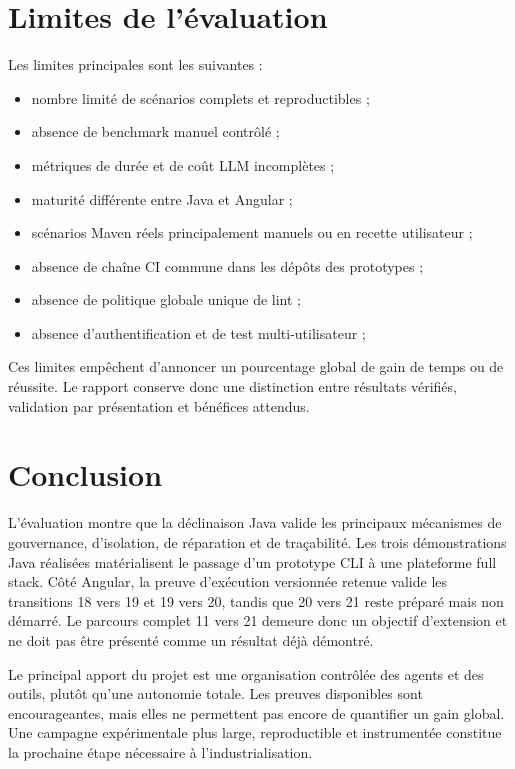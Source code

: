 \section{Limites de l'évaluation}

Les limites principales sont les suivantes :

\begin{itemize}
    \item nombre limité de scénarios complets et reproductibles ;
    \item absence de benchmark manuel contrôlé ;
    \item métriques de durée et de coût LLM incomplètes ;
    \item maturité différente entre Java et Angular ;
    \item scénarios Maven réels principalement manuels ou en recette utilisateur ;
    \item absence de chaîne CI commune dans les dépôts des prototypes ;
    \item absence de politique globale unique de lint ;
    \item absence d'authentification et de test multi-utilisateur ;
\end{itemize}

Ces limites empêchent d'annoncer un pourcentage global de gain de temps ou de réussite. Le rapport conserve donc une distinction entre résultats vérifiés, validation par présentation et bénéfices attendus.

\section*{Conclusion}

L'évaluation montre que la déclinaison Java valide les principaux mécanismes de gouvernance, d'isolation, de réparation et de traçabilité. Les trois démonstrations Java réalisées matérialisent le passage d'un prototype CLI à une plateforme full stack. Côté Angular, la preuve d'exécution versionnée retenue valide les transitions 18 vers 19 et 19 vers 20, tandis que 20 vers 21 reste préparé mais non démarré. Le parcours complet 11 vers 21 demeure donc un objectif d'extension et ne doit pas être présenté comme un résultat déjà démontré.

Le principal apport du projet est une organisation contrôlée des agents et des outils, plutôt qu'une autonomie totale. Les preuves disponibles sont encourageantes, mais elles ne permettent pas encore de quantifier un gain global. Une campagne expérimentale plus large, reproductible et instrumentée constitue la prochaine étape nécessaire à l'industrialisation.
